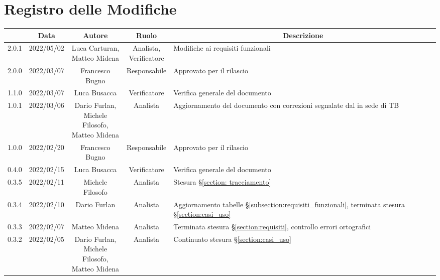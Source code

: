 \thispagestyle{empty}
\section*{Registro delle Modifiche}
\begin{center}
	\renewcommand{\arraystretch}{1.8}
	\begin{longtable}[c]{c | c | c | c | p{5cm}}
		\rowcolor[HTML]{125E28}
		\multicolumn{1}{c}{\color[HTML]{FFFFFF} \textbf{Versione}} &
		\multicolumn{1}{c}{\color[HTML]{FFFFFF} \textbf{Data}}     &
		\multicolumn{1}{c}{\color[HTML]{FFFFFF} \textbf{Autore}}   &
		\multicolumn{1}{c}{\color[HTML]{FFFFFF} \textbf{Ruolo}}    &
		\multicolumn{1}{c}{\color[HTML]{FFFFFF} \textbf{Descrizione}} \\
		\endhead
		2.0.1 & 2022/05/02 & \Longunderstack{Luca Carturan,\\Matteo Midena} & \Longunderstack{Analista,\\Verificatore} & Modifiche ai requisiti funzionali\\
		2.0.0 & 2022/03/07 & Francesco Bugno & Responsabile & Approvato per il rilascio\\
		1.1.0 & 2022/03/07 & Luca Busacca & Verificatore & Verifica generale del documento\\
		1.0.1 & 2022/03/06 & \Shortunderstack{Dario Furlan,\\Michele Filosofo,\\Matteo Midena} & Analista & Aggiornamento del documento con correzioni segnalate dal \commitNameS{} in sede di TB \\
		1.0.0 & 2022/02/20 & Francesco Bugno & Responsabile & Approvato per il rilascio\\
		0.4.0 & 2022/02/15 & Luca Busacca & Verificatore & Verifica generale del documento\\
		0.3.5 & 2022/02/11 & Michele Filosofo & Analista & Stesura §\ref{section: tracciamento}\\
		0.3.4 & 2022/02/10 & Dario Furlan & Analista & Aggiornamento tabelle §\ref{subsection:requisiti_funzionali}, terminata stesura §\ref{section:casi_uso} \\
		0.3.3 & 2022/02/07 & Matteo Midena & Analista & Terminata stesura §\ref{section:requisiti}, controllo errori ortografici \\
		0.3.2 & 2022/02/05 & \Shortunderstack{Dario Furlan,\\Michele Filosofo,\\Matteo Midena\\} & Analista & Continuato stesura §\ref{section:casi_uso} \\

\end{longtable}
\end{center}

